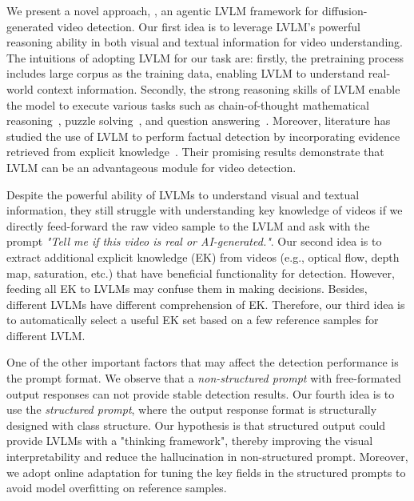 We present a novel approach, \emph{\lavid}, an agentic LVLM framework for diffusion-generated video detection. Our first idea is to leverage LVLM's powerful reasoning ability in both visual and textual information for video understanding.
The intuitions of adopting LVLM for our task are: firstly, the pretraining process includes large corpus as the training data, enabling LVLM to understand real-world context information. Secondly, the strong reasoning skills of LVLM enable the model to execute various tasks such as chain-of-thought mathematical reasoning~\cite{ahn2024largelanguagemodelsmathematical}, puzzle solving~\cite{giadikiaroglou2024puzzlesolvingusingreasoning}, and question answering~\cite{kamalloo2023evaluatingopendomainquestionanswering}. Moreover, literature has studied the use of LVLM to perform factual detection by incorporating evidence retrieved from explicit knowledge~\cite{fatahi-bayat-etal-2023-fleek}. Their promising results demonstrate that LVLM can be an advantageous module for video detection. 




Despite the powerful ability of LVLMs to understand visual and textual information, they still struggle with understanding key knowledge of videos if we directly feed-forward the raw video sample to the LVLM and ask with the prompt \textit{"Tell me if this video is real or AI-generated."}. Our second idea is to extract additional explicit knowledge (EK) from videos (e.g., optical flow, depth map, saturation, etc.) that have beneficial functionality for detection. However, feeding all EK to LVLMs may confuse them in making decisions. Besides, different LVLMs have different comprehension of EK. Therefore, our third idea is to automatically select a useful EK set based on a few reference samples for different LVLM.

One of the other important factors that may affect the detection performance is the prompt format. We observe that a \emph{non-structured prompt} with free-formated output responses can not provide stable detection results. Our fourth idea is to use the \emph{structured prompt}, where the output response format is structurally designed with class structure. Our hypothesis is that structured output could provide LVLMs with a "thinking framework", thereby improving the visual interpretability and reduce the hallucination in non-structured prompt. Moreover, we adopt online adaptation for tuning the key fields in the structured prompts to avoid model overfitting on reference samples.



